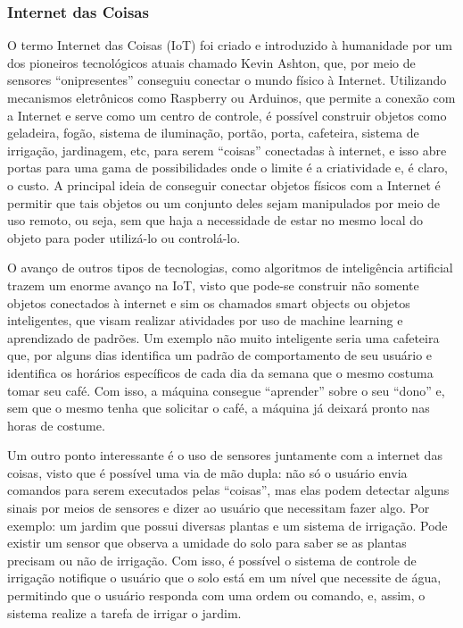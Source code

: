             \subsubsection{Internet das Coisas}
                \par O termo Internet das Coisas (IoT) foi criado e introduzido à humanidade por um dos pioneiros tecnológicos atuais chamado Kevin Ashton, que, por meio de sensores “onipresentes” conseguiu conectar o mundo físico à Internet. Utilizando mecanismos eletrônicos como Raspberry ou Arduinos, que permite a conexão com a Internet e serve como um centro de controle, é possível construir objetos como geladeira, fogão, sistema de iluminação, portão, porta, cafeteira, sistema de irrigação, jardinagem, etc, para serem “coisas” conectadas à internet, e isso abre portas para uma gama de possibilidades onde o limite é a criatividade e, é claro, o custo. A principal ideia de conseguir conectar objetos físicos com a Internet é permitir que tais objetos ou um conjunto deles sejam manipulados por meio de uso remoto, ou seja, sem que haja a necessidade de estar no mesmo local do objeto para poder utilizá-lo ou controlá-lo.
                \par O avanço de outros tipos de tecnologias, como algoritmos de inteligência artificial trazem um enorme avanço na IoT, visto que pode-se construir não somente objetos conectados à internet e sim os chamados smart objects ou objetos inteligentes, que visam realizar atividades por uso de machine learning e aprendizado de padrões. Um exemplo não muito inteligente seria uma cafeteira que, por alguns dias identifica um padrão de comportamento de seu usuário e identifica os horários específicos de cada dia da semana que o mesmo costuma tomar seu café. Com isso, a máquina consegue “aprender” sobre o seu “dono” e, sem que o mesmo tenha que solicitar o café, a máquina já deixará pronto nas horas de costume.
                \par Um outro ponto interessante é o uso de sensores juntamente com a internet das coisas, visto que é possível uma via de mão dupla: não só o usuário envia comandos para serem executados pelas “coisas”, mas elas podem detectar alguns sinais por meios de sensores e dizer ao usuário que necessitam fazer algo. Por exemplo: um jardim que possui diversas plantas e um sistema de irrigação. Pode existir um sensor que observa a umidade do solo para saber se as plantas precisam ou não de irrigação. Com isso, é possível o sistema de controle de irrigação notifique o usuário que o solo está em um nível que necessite de água, permitindo que o usuário responda com uma ordem ou comando, e, assim, o sistema realize a tarefa de irrigar o jardim.


